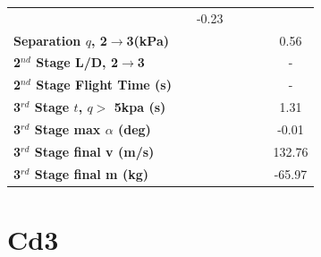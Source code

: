 \begin{table}[ht]
\begin{tabular}{l c c c c c c}
	& \secondthirdSeparationgammaTThreeOneHundredTenNoReturn
	&-0.23
	\\
	\textbf{Separation $q$, 2$\rightarrow$3(kPa)}
	& \secondthirdSeparationqTThreeNinetyNoReturn
	& \secondthirdSeparationqTThreeNinetyFiveNoReturn
	& \secondthirdSeparationqTThreeStandardNoReturn
	& \secondthirdSeparationqTThreeOneHundredFiveNoReturn
	& \secondthirdSeparationqTThreeOneHundredTenNoReturn
	&0.56
	\\
	\textbf{2$^{nd}$ Stage L/D, 2$\rightarrow$3}
	& \secondthirdSeparationLDTThreeNinetyNoReturn
	& \secondthirdSeparationLDTThreeNinetyFiveNoReturn
	& \secondthirdSeparationLDTThreeStandardNoReturn
	& \secondthirdSeparationLDTThreeOneHundredFiveNoReturn
	& \secondthirdSeparationLDTThreeOneHundredTenNoReturn
	& -
	\\
	\textbf{2$^{nd}$ Stage Flight Time (s)}
	& \secondFlightTimeTThreeNinetyNoReturn
	& \secondFlightTimeTThreeNinetyFiveNoReturn
	& \secondFlightTimeTThreeStandardNoReturn
	& \secondFlightTimeTThreeOneHundredFiveNoReturn
	& \secondFlightTimeTThreeOneHundredTenNoReturn
	& -
	\\
	\textbf{3$^{rd}$ Stage $t$, $q >$ 5kpa (s)}
	& \thirdqOverFiveTThreeNinetyNoReturn
	& \thirdqOverFiveTThreeNinetyFiveNoReturn
	& \thirdqOverFiveTThreeStandardNoReturn
	& \thirdqOverFiveTThreeOneHundredFiveNoReturn
	& \thirdqOverFiveTThreeOneHundredTenNoReturn
	&1.31
	\\
	\textbf{3$^{rd}$ Stage max $\alpha$ (deg)}
	& \thirdmaxAoATThreeNinetyNoReturn
	& \thirdmaxAoATThreeNinetyFiveNoReturn
	& \thirdmaxAoATThreeStandardNoReturn
	& \thirdmaxAoATThreeOneHundredFiveNoReturn
	& \thirdmaxAoATThreeOneHundredTenNoReturn
	&-0.01
	\\
	\textbf{3$^{rd}$ Stage final v (m/s)}
	& \thirdcircvTThreeNinetyNoReturn
	& \thirdcircvTThreeNinetyFiveNoReturn
	& \thirdcircvTThreeStandardNoReturn
	& \thirdcircvTThreeOneHundredFiveNoReturn
	& \thirdcircvTThreeOneHundredTenNoReturn
	&132.76
	\\
	\textbf{3$^{rd}$ Stage final m (kg)}
	& \thirdcircmTThreeNinetyNoReturn
	& \thirdcircmTThreeNinetyFiveNoReturn
	& \thirdcircmTThreeStandardNoReturn
	& \thirdcircmTThreeOneHundredFiveNoReturn
	& \thirdcircmTThreeOneHundredTenNoReturn
	&-65.97
	\\
	\hline 
\end{tabular} 
\end{table}


\section{Cd3}

